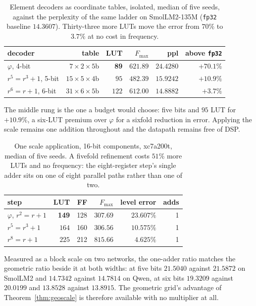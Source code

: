 \documentclass[11pt]{article}
\theoremstyle{definition}
\begin{document}
\begin{table}[t]\centering
\caption{Element decoders as coordinate tables, isolated, median of five seeds,
against the perplexity of the same ladder on SmolLM2-135M
(\texttt{fp32} baseline $14.3607$). Thirty-three more LUTs move the error from
$70\%$ to $3.7\%$ at no cost in frequency.}
\label{tab:elemsil}
\begin{tabular}{lrrrrr}
\toprule
decoder & table & LUT & $F_{\max}$ & ppl & above \texttt{fp32} \\
\midrule
$\varphi$, 4-bit          & $7\times2\times5$b  & \textbf{89} & $621.89$ & $24.4280$ & $+70.1\%$ \\
$r^5{=}r^3{+}1$, 5-bit    & $15\times5\times4$b & $95$ & $482.39$ & $15.9242$ & $+10.9\%$ \\
$r^6{=}r{+}1$, 6-bit      & $31\times6\times5$b & $122$ & $612.00$ & $\mathbf{14.8882}$ & $\mathbf{+3.7\%}$ \\
\bottomrule
\end{tabular}
\end{table}

The middle rung is the one a budget would choose: five bits and $95$ LUT for
$+10.9\%$, a six-LUT premium over $\varphi$ for a sixfold reduction in error.
Applying the scale remains one addition throughout and the datapath remains free
of DSP.

\begin{table}[t]\centering
\caption{One scale application, 16-bit components, xc7a200t, median of five
seeds. A fivefold refinement costs $51\%$ more LUTs and no frequency: the
eight-register step's single adder sits on one of eight parallel paths rather
than one of two.}
\label{tab:oneadder}
\begin{tabular}{lrrrrr}
\toprule
step & LUT & FF & $F_{\max}$ & level error & adds \\
\midrule
$\varphi$, $r^2=r+1$   & \textbf{149} & 128 & $307.69$ & $23.607\%$ & 1 \\
$r^5=r^3+1$            & $164$ & 160 & $306.56$ & $10.575\%$ & 1 \\
$r^8=r+1$              & $225$ & 212 & $\mathbf{815.66}$ & $\mathbf{4.625\%}$ & 1 \\
\bottomrule
\end{tabular}
\end{table}

Measured as a block scale on two networks, the one-adder ratio matches the
geometric ratio beside it at both widths: at five bits $21.5040$ against
$21.5872$ on SmolLM2 and $14.7342$ against $14.7814$ on Qwen, at six bits
$19.3209$ against $20.0199$ and $13.8528$ against $13.8915$. The geometric
grid's advantage of Theorem~\ref{thm:geoscale} is therefore available with no
multiplier at all.
\end{document}
